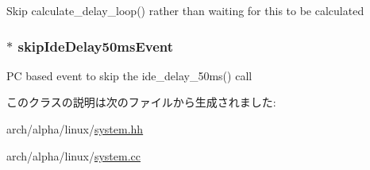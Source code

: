 \label{classLinuxAlphaSystem_a9cab420f2dc7381c4c07941ff49c8167}
Skip calculate\_\-delay\_\-loop() rather than waiting for this to be calculated \hypertarget{classLinuxAlphaSystem_accb807c7d7a32466eb9f7ddf7e07d582}{
\subsubsection[{skipIdeDelay50msEvent}]{$\ast$ {\bf skipIdeDelay50msEvent}}}
\label{classLinuxAlphaSystem_accb807c7d7a32466eb9f7ddf7e07d582}
PC based event to skip the ide\_\-delay\_\-50ms() call 

このクラスの説明は次のファイルから生成されました:\begin{DoxyCompactItemize}
\item 
arch/alpha/linux/\hyperlink{arch_2alpha_2linux_2system_8hh}{system.hh}\item 
arch/alpha/linux/\hyperlink{arch_2alpha_2linux_2system_8cc}{system.cc}\end{DoxyCompactItemize}
